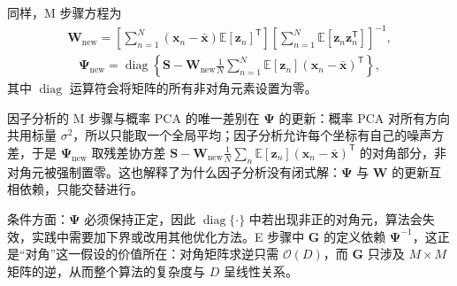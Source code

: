 \documentclass[../../main.tex]{subfiles}
\begin{document}
同样，M 步骤方程为
\begin{align}
  \bm{W}_{\text{new}}=\left[\sum_{n=1}^{N}(\bm{x}_n-\bar{\bm{x}})\mathbb{E}[\bm{z}_n]^{\mathsf T}\right]\left[\sum_{n=1}^{N}\mathbb{E}[\bm{z}_n\bm{z}_n^{\mathsf T}]\right]^{-1},
  \label{align:ch16-FA-M步W}
\end{align}
\begin{align}
  \bm{\Psi}_{\text{new}}=\operatorname{diag}\left\{\bm{S}-\bm{W}_{\text{new}}\frac{1}{N}\sum_{n=1}^{N}\mathbb{E}[\bm{z}_n](\bm{x}_n-\bar{\bm{x}})^{\mathsf T}\right\},
  \label{align:ch16-FA-M步Psi}
\end{align}
其中 $\operatorname{diag}$ 运算符会将矩阵的所有非对角元素设置为零。

\begin{remark}
因子分析的 M 步骤与概率 PCA 的唯一差别在 $\bm{\Psi}$ 的更新：概率 PCA 对所有方向共用标量 $\sigma^2$，所以只能取一个全局平均；因子分析允许每个坐标有自己的噪声方差，于是 $\bm{\Psi}_{\text{new}}$ 取残差协方差 $\bm{S}-\bm{W}_{\text{new}}\frac{1}{N}\sum_n\mathbb{E}[\bm{z}_n](\bm{x}_n-\bar{\bm{x}})^{\mathsf T}$ 的对角部分，非对角元被强制置零。这也解释了为什么因子分析没有闭式解：$\bm{\Psi}$ 与 $\bm{W}$ 的更新互相依赖，只能交替进行。

条件方面：$\bm{\Psi}$ 必须保持正定，因此 $\operatorname{diag}\{\cdot\}$ 中若出现非正的对角元，算法会失效，实践中需要加下界或改用其他优化方法。E 步骤中 $\bm{G}$ 的定义依赖 $\bm{\Psi}^{-1}$，这正是“对角”这一假设的价值所在：对角矩阵求逆只需 $\mathcal{O}(D)$，而 $\bm{G}$ 只涉及 $M\times M$ 矩阵的逆，从而整个算法的复杂度与 $D$ 呈线性关系。
\end{remark}
\end{document}
